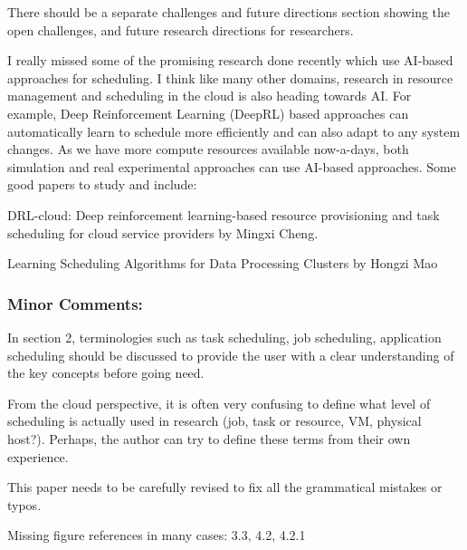 
There should be a separate challenges and future directions section showing the open challenges, and future research directions for researchers.


I really missed some of the promising research done recently which use AI-based approaches for scheduling. I think like many other domains, research in resource management and scheduling in the cloud is also heading towards AI. For example, Deep Reinforcement Learning (DeepRL) based approaches can automatically learn to schedule more efficiently and can also adapt to any system changes. As we have more compute resources available now-a-days, both simulation and real experimental approaches can use AI-based approaches. Some good papers to study and include:



DRL-cloud: Deep reinforcement learning-based resource provisioning and task scheduling for cloud service providers by Mingxi Cheng.


Learning Scheduling Algorithms for Data Processing Clusters by Hongzi Mao



\subsubsection{Minor Comments:}

In section 2, terminologies such as task scheduling, job scheduling, application scheduling should be discussed to provide the user with a clear understanding of the key concepts before going need.


From the cloud perspective, it is often very confusing to define what level of scheduling is actually used in research (job, task or resource, VM, physical host?). Perhaps, the author can try to define these terms from their own experience.


This paper needs to be carefully revised to fix all the grammatical mistakes or typos.


Missing figure references in many cases: 3.3, 4.2, 4.2.1




